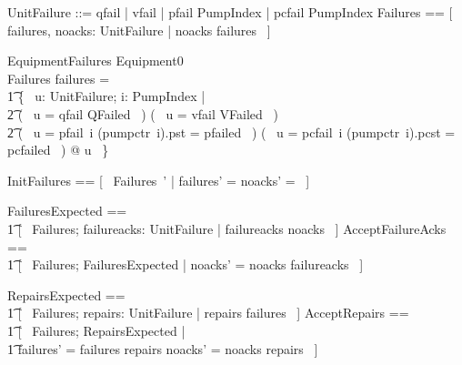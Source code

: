 \documentclass{report} %
\begin{document}
\begin{zed}
  UnitFailure ::= qfail | vfail | pfail \ldata PumpIndex \rdata | pcfail \ldata PumpIndex \rdata
  \also %
  Failures == [~ failures, noacks: \power UnitFailure | noacks \subseteq failures ~]
\end{zed}

\begin{schema}{EquipmentFailures}
  Equipment0
  \\ %
  Failures
  \where %
  failures =
  \\ %
  \t1
    \{~ u: UnitFailure; i: PumpIndex | \\ %
    \t2
      (~ u = qfail \land QFailed ~) \lor {} %
      (~ u = vfail \land VFailed ~) \lor {} %
      \\ %
    \t2
      (~ u = pfail~i \land (pumpctr~i).pst = pfailed ~) \lor {} %
      (~ u = pcfail~i \land (pumpctr~i).pcst = pcfailed ~) @ u ~\}
\end{schema}

\begin{zed}
  InitFailures == [~ Failures~' | failures' = \emptyset \land noacks' = \emptyset ~]
\end{zed}

\begin{zed}
  FailuresExpected ==
  \\ %
  \t1 [~ Failures; failureacks: \power UnitFailure | failureacks \subseteq noacks ~]
  \also %
  AcceptFailureAcks ==
  \\ %
  \t1 [~ \Delta Failures; FailuresExpected | noacks' = noacks \setminus failureacks ~]
\end{zed}

\begin{zed}
  RepairsExpected ==
  \\ %
  \t1 [~ Failures; repairs: \power UnitFailure | repairs \subseteq failures ~]
  \also %
  AcceptRepairs ==
  \\ %
  \t1
    [~ \Delta Failures; RepairsExpected | %
    \\ %
    \t1 failures' = failures \setminus repairs \land noacks' = noacks \setminus repairs ~]
\end{zed}
\end{document}
